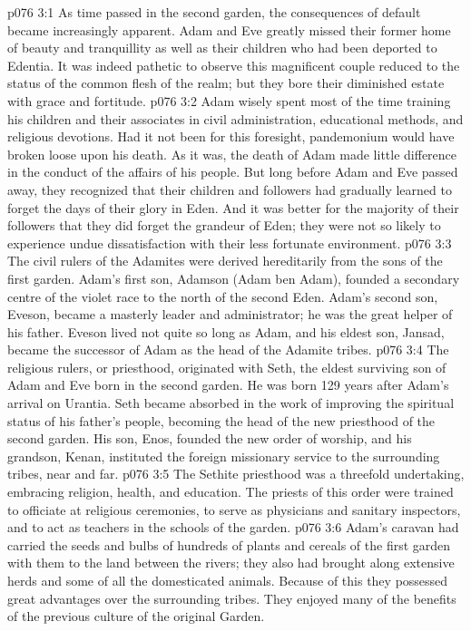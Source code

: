 \vs p076 3:1 As time passed in the second garden, the consequences of default became increasingly apparent. Adam and Eve greatly missed their former home of beauty and tranquillity as well as their children who had been deported to Edentia. It was indeed pathetic to observe this magnificent couple reduced to the status of the common flesh of the realm; but they bore their diminished estate with grace and fortitude.
\vs p076 3:2 Adam wisely spent most of the time training his children and their associates in civil administration, educational methods, and religious devotions. Had it not been for this foresight, pandemonium would have broken loose upon his death. As it was, the death of Adam made little difference in the conduct of the affairs of his people. But long before Adam and Eve passed away, they recognized that their children and followers had gradually learned to forget the days of their glory in Eden. And it was better for the majority of their followers that they did forget the grandeur of Eden; they were not so likely to experience undue dissatisfaction with their less fortunate environment.
\vs p076 3:3 \pc The civil rulers of the Adamites were derived hereditarily from the sons of the first garden. Adam’s first son, Adamson (Adam ben Adam), founded a secondary centre of the violet race to the north of the second Eden. Adam’s second son, Eveson, became a masterly leader and administrator; he was the great helper of his father. Eveson lived not quite so long as Adam, and his eldest son, Jansad, became the successor of Adam as the head of the Adamite tribes.
\vs p076 3:4 \pc The religious rulers, or priesthood, originated with Seth, the eldest surviving son of Adam and Eve born in the second garden. He was born 129 years after Adam’s arrival on Urantia. Seth became absorbed in the work of improving the spiritual status of his father’s people, becoming the head of the new priesthood of the second garden. His son, Enos, founded the new order of worship, and his grandson, Kenan, instituted the foreign missionary service to the surrounding tribes, near and far.
\vs p076 3:5 The Sethite priesthood was a threefold undertaking, embracing religion, health, and education. The priests of this order were trained to officiate at religious ceremonies, to serve as physicians and sanitary inspectors, and to act as teachers in the schools of the garden.
\vs p076 3:6 \pc Adam’s caravan had carried the seeds and bulbs of hundreds of plants and cereals of the first garden with them to the land between the rivers; they also had brought along extensive herds and some of all the domesticated animals. Because of this they possessed great advantages over the surrounding tribes. They enjoyed many of the benefits of the previous culture of the original Garden.
